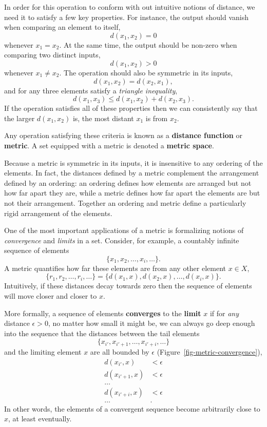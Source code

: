 \documentclass[
  letterpaper,
  DIV=11,
  numbers=noendperiod]{scrartcl}
\begin{document}
In order for this operation to conform with out intuitive notions of
distance, we need it to satisfy a few key properties. For instance, the
output should vanish when comparing an element to itself, \[
d(x_{1}, x_{2}) = 0
\] whenever \(x_{1} = x_{2}\). At the same time, the output should be
non-zero when comparing two distinct inputs, \[
d(x_{1}, x_{2}) > 0
\] whenever \(x_{1} \ne x_{2}\). The operation should also be symmetric
in its inputs, \[
d(x_{1}, x_{2}) = d(x_{2}, x_{1}),
\] and for any three elements satisfy a \emph{triangle inequality}, \[
d(x_{1}, x_{3}) \le d(x_{1}, x_{2}) + d(x_{2}, x_{3}).
\] If the operation satisfies all of these properties then we can
consistently say that the larger \(d(x_{1}, x_{2})\) is, the most
distant \(x_{1}\) is from \(x_{2}\).

Any operation satisfying these criteria is known as a \textbf{distance
function} or \textbf{metric}. A set equipped with a metric is denoted a
\textbf{metric space}.

Because a metric is symmetric in its inputs, it is insensitive to any
ordering of the elements. In fact, the distances defined by a metric
complement the arrangement defined by an ordering: an ordering defines
how elements are arranged but not how far apart they are, while a metric
defines how far apart the elements are but not their arrangement.
Together an ordering and metric define a particularly rigid arrangement
of the elements.

One of the most important applications of a metric is formalizing
notions of \emph{convergence} and \emph{limits} in a set. Consider, for
example, a countably infinite sequence of elements \[
\{ x_{1}, x_{2}, \ldots, x_{i}, \ldots \}.
\] A metric quantifies how far these elements are from any other element
\(x \in X\), \[
\{ r_{1}, r_{2}, \ldots, r_{i}, \ldots \}
=
\{ d(x_{1}, x), d(x_{2}, x), \ldots, d(x_{i}, x) \}.
\] Intuitively, if these distances decay towards zero then the sequence
of elements will move closer and closer to \(x\).

More formally, a sequence of elements \textbf{converges} to the
\textbf{limit} \(x\) if for \emph{any} distance \(\epsilon > 0\), no
matter how small it might be, we can always go deep enough into the
sequence that the distances between the tail elements \[
\{ x_{i'}, x_{i' + 1}, \ldots, x_{i' + i}, \ldots \}
\] and the limiting element \(x\) are all bounded by \(\epsilon\)
(Figure~\ref{fig-metric-convergence}), \begin{align*}
d(x_{i'}, x) &< \epsilon
\\
d(x_{i' + 1}, x) &< \epsilon
\\
\ldots&
\\
d(x_{i' + i}, x) &< \epsilon
\\
\ldots&.
\end{align*} In other words, the elements of a convergent sequence
become arbitrarily close to \(x\), at least eventually.
\end{document}
